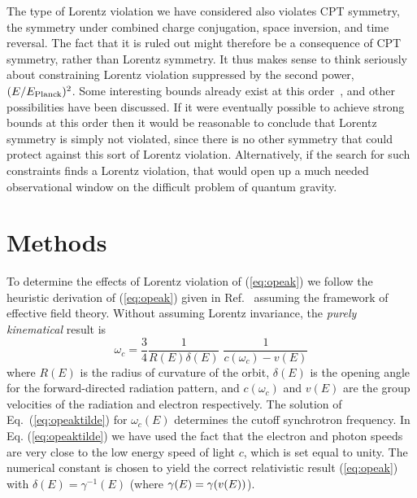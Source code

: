 \documentclass[12pt]{article}
\begin{document}
The type of Lorentz violation we have considered also
violates CPT symmetry\cite{MP}, the symmetry under
combined charge conjugation, space inversion, and time
reversal. The fact that it is ruled out might therefore
be a consequence of CPT symmetry, rather than Lorentz
symmetry. It thus makes sense to think seriously about
constraining Lorentz violation suppressed by the second
power, $(E/E_{\rm Planck})^2$. Some interesting bounds
already exist at this order~\cite{Aloisio:2000cm,JLM02},
and other possibilities have been
discussed\cite{JLM02,Amelino-Camelia:2003bt}. If it were
eventually possible to achieve strong bounds at this
order then it would be reasonable to conclude that
Lorentz symmetry is simply not violated, since there is
no other symmetry that could protect against this sort of
Lorentz violation. Alternatively, if the search for such
constraints finds a Lorentz violation, that would open up
a much needed observational window on the difficult
problem of quantum gravity.

\section*{Methods}

To determine the effects of Lorentz violation of
(\ref{eq:opeak}) we follow the heuristic derivation of
(\ref{eq:opeak}) given in Ref.~\cite{Jackson} assuming
the framework of effective field theory. Without assuming
Lorentz invariance, the {\it purely kinematical} result
is
%
\begin{equation}
\omega_c=\frac{3}{4} \frac{1}{R(E)\delta(E)}\;
\frac{1}{c(\omega_c)-v(E)} \label{eq:opeaktilde}
\end{equation}
%
where $R(E)$ is the radius of curvature of the orbit,
$\delta(E)$ is the opening angle for the forward-directed
radiation pattern, and $c(\omega_c)$ and $v(E)$ are the
group velocities of the radiation and electron
respectively. The solution of Eq.~(\ref{eq:opeaktilde})
for $\omega_c(E)$ determines the cutoff synchrotron
frequency. In Eq. (\ref{eq:opeaktilde}) we have used the
fact that the electron and photon speeds are very close
to the low energy speed of light $c$, which is set equal
to unity. The numerical constant is chosen to yield the
correct relativistic result (\ref{eq:opeak}) with
$\delta(E)=\gamma^{-1}(E)$ (where $\gamma(E)=\gamma(v(E))$).
\end{document}
